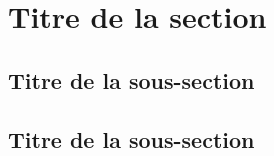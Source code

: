 \clearpage 



\section{Titre de la section}

\subsection{Titre de la sous-section}

\subsection{Titre de la sous-section}


